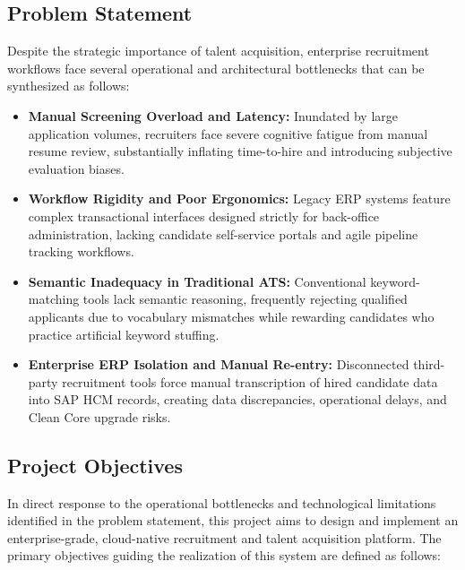 \subsection{Problem Statement}
\label{subsec:problem_statement}

Despite the strategic importance of talent acquisition, enterprise recruitment workflows face several operational and architectural bottlenecks that can be synthesized as follows:

\begin{itemize}
    \item \textbf{Manual Screening Overload and Latency:} Inundated by large application volumes, recruiters face severe cognitive fatigue from manual resume review, substantially inflating time-to-hire and introducing subjective evaluation biases.

    \item \textbf{Workflow Rigidity and Poor Ergonomics:} Legacy ERP systems feature complex transactional interfaces designed strictly for back-office administration, lacking candidate self-service portals and agile pipeline tracking workflows.

    \item \textbf{Semantic Inadequacy in Traditional ATS:} Conventional keyword-matching tools lack semantic reasoning, frequently rejecting qualified applicants due to vocabulary mismatches while rewarding candidates who practice artificial keyword stuffing.

    \item \textbf{Enterprise ERP Isolation and Manual Re-entry:} Disconnected third-party recruitment tools force manual transcription of hired candidate data into SAP HCM records, creating data discrepancies, operational delays, and Clean Core upgrade risks.
\end{itemize}

\subsection{Project Objectives}
\label{subsec:project_objectives}

In direct response to the operational bottlenecks and technological limitations identified in the problem statement, this project aims to design and implement an enterprise-grade, cloud-native recruitment and talent acquisition platform. The primary objectives guiding the realization of this system are defined as follows:

